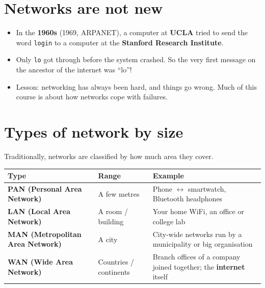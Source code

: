 \section{Networks are not new}

\begin{itemize}
  \item In the \textbf{1960s} (1969, ARPANET), a computer at \textbf{UCLA} tried to send the word \texttt{login} to a computer at the \textbf{Stanford Research Institute}.
  \item Only \texttt{lo} got through before the system crashed. So the very first message on the ancestor of the internet was ``lo''!
  \item Lesson: networking has always been hard, and things go wrong. Much of this course is about how networks cope with failures.
\end{itemize}

\section{Types of network by size}

Traditionally, networks are classified by how much area they cover.

\begin{center}
\end{center}

\begin{center}
\begin{tabularx}{\textwidth}{>{\bfseries}l l X}
\toprule
Type & Range & Example \\
\midrule
PAN (Personal Area Network) & A few metres & Phone $\leftrightarrow$ smartwatch, Bluetooth headphones \\
LAN (Local Area Network) & A room / building & Your home WiFi, an office or college lab \\
MAN (Metropolitan Area Network) & A city & City-wide networks run by a municipality or big organisation \\
WAN (Wide Area Network) & Countries / continents & Branch offices of a company joined together; the \textbf{internet} itself \\
\bottomrule
\end{tabularx}
\end{center}

